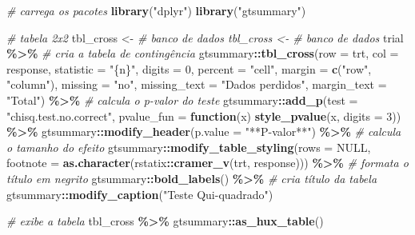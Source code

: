 \documentclass[
]{book}
\newenvironment{Shaded}{\begin{snugshade}}{\end{snugshade}}
\newcommand{\AttributeTok}[1]{\textcolor[rgb]{0.13,0.29,0.53}{#1}}
\newcommand{\CommentTok}[1]{\textcolor[rgb]{0.56,0.35,0.01}{\textit{#1}}}
\newcommand{\ConstantTok}[1]{\textcolor[rgb]{0.56,0.35,0.01}{#1}}
\newcommand{\ControlFlowTok}[1]{\textcolor[rgb]{0.13,0.29,0.53}{\textbf{#1}}}
\newcommand{\DecValTok}[1]{\textcolor[rgb]{0.00,0.00,0.81}{#1}}
\newcommand{\FunctionTok}[1]{\textcolor[rgb]{0.13,0.29,0.53}{\textbf{#1}}}
\newcommand{\NormalTok}[1]{#1}
\newcommand{\OtherTok}[1]{\textcolor[rgb]{0.56,0.35,0.01}{#1}}
\newcommand{\SpecialCharTok}[1]{\textcolor[rgb]{0.81,0.36,0.00}{\textbf{#1}}}
\newcommand{\StringTok}[1]{\textcolor[rgb]{0.31,0.60,0.02}{#1}}
\begin{document}
\begin{Shaded}
\begin{Highlighting}[]
\CommentTok{\# carrega os pacotes}
\FunctionTok{library}\NormalTok{(}\StringTok{"dplyr"}\NormalTok{)}
\FunctionTok{library}\NormalTok{(}\StringTok{"gtsummary"}\NormalTok{)}

\CommentTok{\# tabela 2x2}
\NormalTok{tbl\_cross }\OtherTok{\textless{}{-}} \CommentTok{\# banco de dados tbl\_cross \textless{}{-} \# banco de dados}
\NormalTok{trial }\SpecialCharTok{\%\textgreater{}\%}
    \CommentTok{\# cria a tabela de contingência}
\NormalTok{gtsummary}\SpecialCharTok{::}\FunctionTok{tbl\_cross}\NormalTok{(}\AttributeTok{row =}\NormalTok{ trt, }\AttributeTok{col =}\NormalTok{ response, }\AttributeTok{statistic =} \StringTok{"\{n\}"}\NormalTok{, }\AttributeTok{digits =} \DecValTok{0}\NormalTok{, }\AttributeTok{percent =} \StringTok{"cell"}\NormalTok{,}
    \AttributeTok{margin =} \FunctionTok{c}\NormalTok{(}\StringTok{"row"}\NormalTok{, }\StringTok{"column"}\NormalTok{), }\AttributeTok{missing =} \StringTok{"no"}\NormalTok{, }\AttributeTok{missing\_text =} \StringTok{"Dados perdidos"}\NormalTok{,}
    \AttributeTok{margin\_text =} \StringTok{"Total"}\NormalTok{) }\SpecialCharTok{\%\textgreater{}\%}
    \CommentTok{\# calcula o p{-}valor do teste}
\NormalTok{gtsummary}\SpecialCharTok{::}\FunctionTok{add\_p}\NormalTok{(}\AttributeTok{test =} \StringTok{"chisq.test.no.correct"}\NormalTok{, }\AttributeTok{pvalue\_fun =} \ControlFlowTok{function}\NormalTok{(x) }\FunctionTok{style\_pvalue}\NormalTok{(x,}
    \AttributeTok{digits =} \DecValTok{3}\NormalTok{)) }\SpecialCharTok{\%\textgreater{}\%}
\NormalTok{    gtsummary}\SpecialCharTok{::}\FunctionTok{modify\_header}\NormalTok{(}\AttributeTok{p.value =} \StringTok{"**P{-}valor**"}\NormalTok{) }\SpecialCharTok{\%\textgreater{}\%}
    \CommentTok{\# calcula o tamanho do efeito}
\NormalTok{gtsummary}\SpecialCharTok{::}\FunctionTok{modify\_table\_styling}\NormalTok{(}\AttributeTok{rows =} \ConstantTok{NULL}\NormalTok{, }\AttributeTok{footnote =} \FunctionTok{as.character}\NormalTok{(rstatix}\SpecialCharTok{::}\FunctionTok{cramer\_v}\NormalTok{(trt,}
\NormalTok{    response))) }\SpecialCharTok{\%\textgreater{}\%}
    \CommentTok{\# formata o título em negrito}
\NormalTok{gtsummary}\SpecialCharTok{::}\FunctionTok{bold\_labels}\NormalTok{() }\SpecialCharTok{\%\textgreater{}\%}
    \CommentTok{\# cria título da tabela}
\NormalTok{gtsummary}\SpecialCharTok{::}\FunctionTok{modify\_caption}\NormalTok{(}\StringTok{"Teste Qui{-}quadrado"}\NormalTok{)}

\CommentTok{\# exibe a tabela}
\NormalTok{tbl\_cross }\SpecialCharTok{\%\textgreater{}\%}
\NormalTok{    gtsummary}\SpecialCharTok{::}\FunctionTok{as\_hux\_table}\NormalTok{()}
\end{Highlighting}
\end{Shaded}
\end{document}
